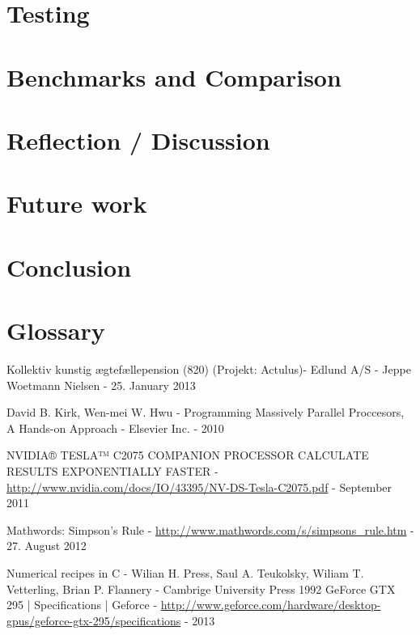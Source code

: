 \documentclass[oribibl]{llncs}
\begin{document}
	\section{Testing}
		
	
	\label{testing}
		
	\section{Benchmarks and Comparison}

	
	\label{bandc}
	
	\section{Reflection / Discussion}		
		
	
	\label{reflection}
		
	\section{Future work}
	
	
	\label{futurework}
	
	\section{Conclusion}
	
	
	\label{conclusion}
		
	\section{Glossary}
	
	
		
	\begin{thebibliography}{9}
			 Kollektiv kunstig ægtefællepension (820) (Projekt: Actulus)- Edlund A/S - Jeppe Woetmann Nielsen - 25. January 2013 
			
			 David B. Kirk, Wen-mei W. Hwu - Programming Massively Parallel Proccesors, A Hands-on Approach - Elsevier Inc. - 2010
			
			 NVIDIA® TESLA™ C2075 COMPANION PROCESSOR CALCULATE RESULTS EXPONENTIALLY FASTER  - \url{http://www.nvidia.com/docs/IO/43395/NV-DS-Tesla-C2075.pdf} - September 2011
			
			 Mathwords: Simpson's Rule - \url{http://www.mathwords.com/s/simpsons_rule.htm} - 27. August 2012
			
			 Numerical recipes in C - Wilian H. Press, Saul A. Teukolsky, Wiliam T. Vetterling, Brian P. Flannery - Cambrige University Press 1992
			 GeForce GTX 295 | Specifications | Geforce - \url{http://www.geforce.com/hardware/desktop-gpus/geforce-gtx-295/specifications} - 2013
	\end{thebibliography}
	
\end{document}

